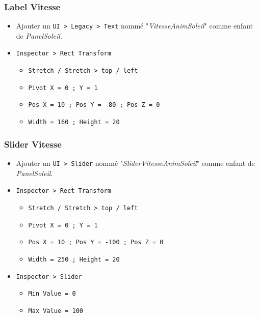 \documentclass[a4paper,10pt]{article}
\newenvironment{solution}%
{\begin{tcolorbox}[breakable,colback=red!5!white,colframe=red!75!black,title=Solution]}%
{\end{tcolorbox}}
\begin{document}
\begin{solution}
\subsubsection{Label Vitesse}
\begin{itemize}
	\item Ajouter un \texttt{UI > Legacy > Text} nommé "\textit{VitesseAnimSoleil}" comme enfant de \textit{PanelSoleil}.
	\item \texttt{Inspector > Rect Transform}
	\begin{itemize}
		\item \texttt{Stretch / Stretch > top / left}
		\item \texttt{Pivot X = 0 ; Y = 1}
		\item \texttt{Pos X = 10 ; Pos Y = -80 ; Pos Z = 0}
		\item \texttt{Width = 160 ; Height = 20}	
	\end{itemize}
\end{itemize}

\subsubsection{Slider Vitesse}
\begin{itemize}
	\item Ajouter un \texttt{UI > Slider} nommé "\textit{SliderVitesseAnimSoleil}" comme enfant de \textit{PanelSoleil}.
	\item \texttt{Inspector > Rect Transform}
	\begin{itemize}
		\item \texttt{Stretch / Stretch > top / left}
		\item \texttt{Pivot X = 0 ; Y = 1}
		\item \texttt{Pos X = 10 ; Pos Y = -100 ; Pos Z = 0}
		\item \texttt{Width = 250 ; Height = 20}	
	\end{itemize}
\item \texttt{Inspector > Slider}
\begin{itemize}
	\item \texttt{Min Value = 0}
	\item \texttt{Max Value = 100}
\end{itemize}
\end{itemize}


\end{solution}
\end{document}
